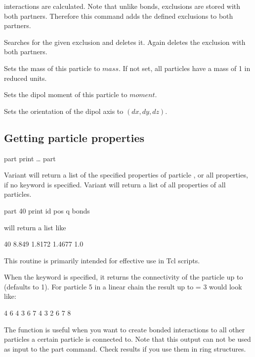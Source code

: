 \begin{arguments}
  interactions are calculated. Note that unlike bonds, exclusions are
  stored with both partners.  Therefore this command adds the defined
  exclusions to both partners.
\item[\opt{exclude delete \var{pid2}\dots}] Searches for the
  given exclusion and deletes it. Again deletes the exclusion with
  both partners.
  \item[\opt{mass \var{mass}}] Sets the mass of this particle to $mass$. If not
  set, all particles have a mass of 1 in reduced units.
  \item[\opt{dipm \var{moment}}] Sets the dipol moment of this particle to $moment$.
  \item[\opt{dip \var{dx} \var{dy} \var{dz}}] Sets the orientation of the
  dipol axis to $(dx,dy,dz)$.
 
  \end{arguments}
\subsection{Getting particle properties}

\begin{essyntax}
  part  print
  \dots
   part
\end{essyntax}

Variant  will return a list of the specified properties of
particle , or all properties, if no keyword is
specified.  Variant  will return a list of all properties
of all particles.

\begin{code}
part 40 print id pos q bonds
\end{code}
will return a list like
\begin{tclcode}
40 8.849 1.8172 1.4677 1.0 {}
\end{tclcode}
This routine is primarily intended for effective use in Tcl scripts.

When the keyword  is specified, it returns the
connectivity of the particle up to  (defaults to 1). For
particle 5 in a linear chain the result up to  = 3 would
look like:
\begin{tclcode}
{ { 4 } { 6 } } { { 4 3 } { 6 7 } } { {4 3 2 } { 6 7 8 } } 
\end{tclcode}
The function is useful when you want to create bonded interactions to
all other particles a certain particle is connected to. Note that this
output can not be used as input to the part command. Check results if
you use them in ring structures.


